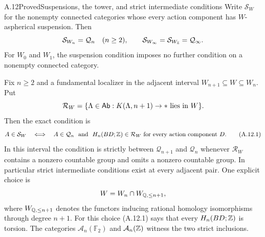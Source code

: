 \begin{claim}{A.12}{Proved}{Suspensions, the tower, and strict intermediate conditions}\label{A:intermediate-localizers}
Write $\mathcal S_W$ for the nonempty connected categories whose every action component has $W$-aspherical suspension. Then
\[
 \mathcal S_{W_n}=\mathcal Q_n\quad(n\geq2),\qquad
 \mathcal S_{W_\infty}=\mathcal S_{W_{\mathbb Z}}=\mathcal Q_\infty.
\]
For $W_0$ and $W_1$, the suspension condition imposes no further condition on a nonempty connected category.

Fix $n\geq2$ and a fundamental localizer in the adjacent interval
$W_{n+1}\subseteq W\subseteq W_n$. Put
\[
 \mathcal R_W=\{\Lambda\in\mathsf{Ab}:K(\Lambda,n+1)\to *\text{ lies in }W\}.
\]
Then the exact condition is
\[
 A\in\mathcal S_W
 \quad\Longleftrightarrow\quad
 A\in\mathcal Q_n\ \text{ and }\
 H_n(BD;\mathbb Z)\in\mathcal R_W
 \text{ for every action component }D.
 \tag{A.12.1}
\]
In this interval the condition is strictly between $\mathcal Q_{n+1}$ and $\mathcal Q_n$ whenever $\mathcal R_W$ contains a nonzero countable group and omits a nonzero countable group. In particular strict intermediate conditions exist at every adjacent pair. One explicit choice is
\[
 W=W_n\cap W_{\mathbb Q,\leq n+1},
\]
where $W_{\mathbb Q,\leq n+1}$ denotes the functors inducing rational homology isomorphisms through degree $n+1$. For this choice (A.12.1) says that every $H_n(BD;\mathbb Z)$ is torsion. The categories $\mathcal A_n(\mathbb F_2)$ and $\mathcal A_n(\mathbb Z)$ witness the two strict inclusions.
\end{claim}
